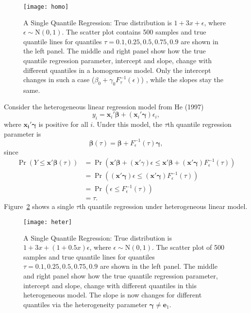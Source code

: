 \documentclass[12pt]{article}
\DeclareMathOperator{\pr}{Pr}
\begin{document}
\begin{figure}[h]
\centerline{\texttt{[image: homo]}}
\caption[]{\label{fig:homo} A Single Quantile Regression: True 
  distribution is $1+3x + \epsilon$, where $\epsilon \sim
  \mathrm{N}(0,1)$. The scatter plot contains 500 samples and true quantile
  lines for quantiles $\tau=0.1,0.25,0.5,0.75,0.9$ are shown in the
  left panel. The middle and right panel show how the true quantile
  regression parameter, intercept and slope, change with different
  quantiles in a homogeneous model. Only the intercept changes in such
  a case ($\beta_0+\gamma_0 F^{-1}_{\tau}(\epsilon)$) , while the slopes
  stay the same.}
\label{fig:homo}
\end{figure}


Consider the heterogeneous linear regression model  from He (1997) 
\begin{displaymath}
y_i = \bm{x}_i'\bm{\beta} + (\bm{x}_i'\bm{\gamma}) \epsilon_i, 
\end{displaymath}
where $\bm{x_i'\gamma}$ is positive  for all
$i$. Under this model, the $\tau$th quantile regression parameter is 
\begin{equation}\label{eq:2}
\bm{\beta}(\tau) = \bm{\beta} + F^{-1}_{\epsilon}(\tau) \bm{\gamma},
\end{equation}
since 
\begin{align*}
\pr (Y \le \bm{x'\beta}(\tau)) & = \pr \left( \bm{x'\beta} +
  (\bm{x}'\gamma) \epsilon \le \bm{x'\beta} + (\bm{x'\gamma})
  F^{-1}_{\epsilon}(\tau) \right) \\
& = \pr \left( (\bm{x'\gamma}) \epsilon \le  (\bm{x'\gamma})
  F^{-1}_{\epsilon}(\tau)  \right)\\
& = \pr (\epsilon \le F^{-1}_{\epsilon}(\tau)) \\
& = \tau .
\end{align*}
Figure~\ref{fig:hetero} shows a single $\tau$th quantile regression under
heterogeneous linear model.  

\begin{figure}[h]
\centerline{\texttt{[image: heter]}}
\caption[]{ \label{fig:heter} A Single Quantile Regression: True
  distribution is $1+3x + (1+0.5x)\epsilon$, where $\epsilon \sim
  \mathrm{N}(0,1)$. The scatter plot of 500 samples and true quantile
  lines for quantiles $\tau=0.1,0.25,0.5,0.75,0.9$ are shown in the
  left panel. The middle and right panel show how the true quantile
  regression parameter, intercept and slope, change with different
  quantiles in this heterogeneous model. The slope is now changes 
  for different quantiles via the heterogeneity parameter $\bm{\gamma}
  \neq \bm{e}_1$.  }
\label{fig:hetero}
\end{figure}
\end{document}
